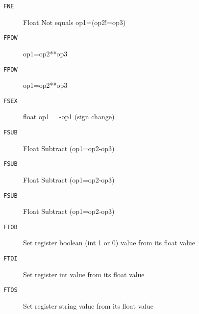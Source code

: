 
\begin{description}
\item[\texttt{FNE        }]  Float Not equals op1=(op2!=op3)\\
\end{description}

\begin{description}
\item[\texttt{FPOW       }]  op1=op2**op3\\
\end{description}

\begin{description}
\item[\texttt{FPOW       }]  op1=op2**op3\\
\end{description}

\begin{description}
\item[\texttt{FSEX       }]  float op1 = -op1 (sign change)\\
\end{description}

\begin{description}
\item[\texttt{FSUB       }]  Float Subtract (op1=op2-op3)\\
\end{description}

\begin{description}
\item[\texttt{FSUB       }]  Float Subtract (op1=op2-op3)\\
\end{description}

\begin{description}
\item[\texttt{FSUB       }]  Float Subtract (op1=op2-op3)\\
\end{description}

\begin{description}
\item[\texttt{FTOB       }]  Set register boolean (int 1 or 0) value from its float value\\
\end{description}

\begin{description}
\item[\texttt{FTOI       }]  Set register int value from its float value\\
\end{description}

\begin{description}
\item[\texttt{FTOS       }]  Set register string value from its float value\\
\end{description}
